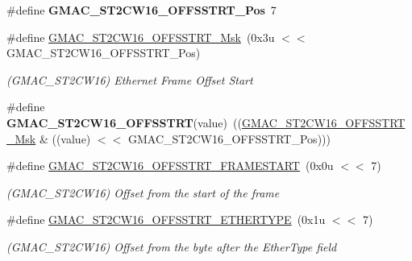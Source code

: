 \begin{DoxyCompactItemize}
\item 
\mbox{\label{group__SAMV71__GMAC_ga44acc2045ff0f4f04c7923c8c2a3b9b1}} 
\#define {\bfseries G\+M\+A\+C\+\_\+\+S\+T2\+C\+W16\+\_\+\+O\+F\+F\+S\+S\+T\+R\+T\+\_\+\+Pos}~7
\item 
\mbox{\label{group__SAMV71__GMAC_gaecb951a57ec8351828cf0b355bd601c1}} 
\#define \mbox{\hyperlink{group__SAMV71__GMAC_gaecb951a57ec8351828cf0b355bd601c1}{G\+M\+A\+C\+\_\+\+S\+T2\+C\+W16\+\_\+\+O\+F\+F\+S\+S\+T\+R\+T\+\_\+\+Msk}}~(0x3u $<$$<$ G\+M\+A\+C\+\_\+\+S\+T2\+C\+W16\+\_\+\+O\+F\+F\+S\+S\+T\+R\+T\+\_\+\+Pos)
\begin{DoxyCompactList}\small\item\em (G\+M\+A\+C\+\_\+\+S\+T2\+C\+W16) Ethernet Frame Offset Start \end{DoxyCompactList}\item 
\mbox{\label{group__SAMV71__GMAC_ga2673a4d4eb595e7b07d37a47c64a2410}} 
\#define {\bfseries G\+M\+A\+C\+\_\+\+S\+T2\+C\+W16\+\_\+\+O\+F\+F\+S\+S\+T\+RT}(value)~((\mbox{\hyperlink{group__SAMV71__GMAC_gaecb951a57ec8351828cf0b355bd601c1}{G\+M\+A\+C\+\_\+\+S\+T2\+C\+W16\+\_\+\+O\+F\+F\+S\+S\+T\+R\+T\+\_\+\+Msk}} \& ((value) $<$$<$ G\+M\+A\+C\+\_\+\+S\+T2\+C\+W16\+\_\+\+O\+F\+F\+S\+S\+T\+R\+T\+\_\+\+Pos)))
\item 
\mbox{\label{group__SAMV71__GMAC_ga3505c9b88aae232779b3c9e07b45c136}} 
\#define \mbox{\hyperlink{group__SAMV71__GMAC_ga3505c9b88aae232779b3c9e07b45c136}{G\+M\+A\+C\+\_\+\+S\+T2\+C\+W16\+\_\+\+O\+F\+F\+S\+S\+T\+R\+T\+\_\+\+F\+R\+A\+M\+E\+S\+T\+A\+RT}}~(0x0u $<$$<$ 7)
\begin{DoxyCompactList}\small\item\em (G\+M\+A\+C\+\_\+\+S\+T2\+C\+W16) Offset from the start of the frame \end{DoxyCompactList}\item 
\mbox{\label{group__SAMV71__GMAC_gaa5c5294e5b80744a89e0d03c7c5910ab}} 
\#define \mbox{\hyperlink{group__SAMV71__GMAC_gaa5c5294e5b80744a89e0d03c7c5910ab}{G\+M\+A\+C\+\_\+\+S\+T2\+C\+W16\+\_\+\+O\+F\+F\+S\+S\+T\+R\+T\+\_\+\+E\+T\+H\+E\+R\+T\+Y\+PE}}~(0x1u $<$$<$ 7)
\begin{DoxyCompactList}\small\item\em (G\+M\+A\+C\+\_\+\+S\+T2\+C\+W16) Offset from the byte after the Ether\+Type field \end{DoxyCompactList}\item 

\end{DoxyCompactItemize}
